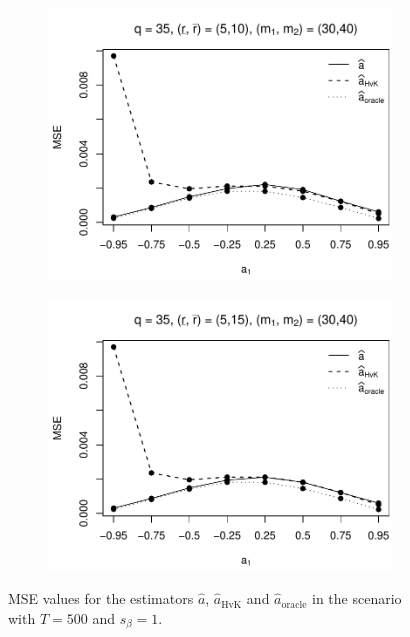 \begin{figure}[p]
\begin{subfigure}[b]{0.45\textwidth}
\includegraphics[width=\textwidth]{Plots/Plots_Supplement/MSE_a_T=500_slope=1_(L1,L2,K1,K2,M1,M2)=(35,35,5,10,30,40).pdf}
\end{subfigure}
\hspace{0.25cm}
\begin{subfigure}[b]{0.45\textwidth}
\includegraphics[width=\textwidth]{Plots/Plots_Supplement/MSE_a_T=500_slope=1_(L1,L2,K1,K2,M1,M2)=(35,35,5,15,30,40).pdf}
\end{subfigure}
\caption{MSE values for the estimators $\widehat{a}$, $\widehat{a}_{\text{HvK}}$ and $\widehat{a}_{\text{oracle}}$ in the scenario with $T=500$ and $s_\beta=1$.}\label{fig:MSE_slope1_AR_robust} 
\end{figure}


